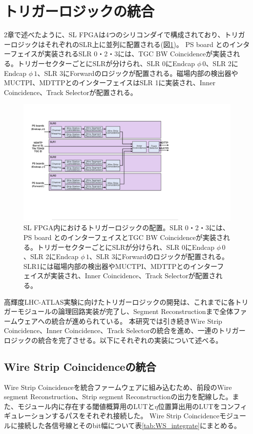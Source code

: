 \section{トリガーロジックの統合}
\label{sec_TriggerIntegration}
2章で述べたように、SL FPGAは4つのシリコンダイで構成されており、トリガーロジックはそれぞれのSLR上に並列に配置される(図\ref{Trigger_floor})。
PS board とのインターフェイスが実装されるSLR 0・2・3には、TGC BW Coincidenceが実装される。トリガーセクターごとにSLRが分けられ、SLR 0にEndcap $\phi\,0$、SLR 2にEndcap $\phi\,1$、SLR 3にForwardのロジックが配置される。磁場内部の検出器やMUCTPI、MDTTPとのインターフェイスはSLR 1に実装され、Inner Coincidence、Track Selectorが配置される。

\begin{figure} 
\centering
\includegraphics[width=16cm]{fig/SL/Trigger_floor.pdf}
\caption[SL FPGA内におけるトリガーロジックの配置]{SL FPGA内におけるトリガーロジックの配置。SLR 0・2・3には、PS board とのインターフェイスとTGC BW Coincidenceが実装される。トリガーセクターごとにSLRが分けられ、SLR 0にEndcap $\phi\,0$、SLR 2にEndcap $\phi\,1$、SLR 3にForwardのロジックが配置される。SLR1には磁場内部の検出器やMUCTPI、MDTTPとのインターフェイスが実装され、Inner Coincidence、Track Selectorが配置される。}
\label{Trigger_floor}
\end{figure}

高輝度LHC-ATLAS実験に向けたトリガーロジックの開発は、これまでに各トリガーモジュールの論理回路実装が完了し、Segment Reconstructionまで全体ファームウェアへの統合が進められている。
本研究では引き続きWire Strip Coincidence、Inner Coincidence、Track Selectorの統合を進め、一連のトリガーロジックの統合を完了させる。以下にそれぞれの実装について述べる。

\subsection{Wire Strip Coincidenceの統合}
Wire Strip Coincidenceを統合ファームウェアに組み込むため、前段のWire segment Reconstruction、Strip segment Reconstructionの出力を配線した。また、モジュール内に存在する\pt  閾値概算用のLUTと$\eta$位置算出用のLUTをコンフィギュレーションするパスをそれぞれ接続した。
Wire Strip Coincidenceモジュールに接続した各信号線とそのbit幅について表\ref{tab:WS_integrate}にまとめる。

